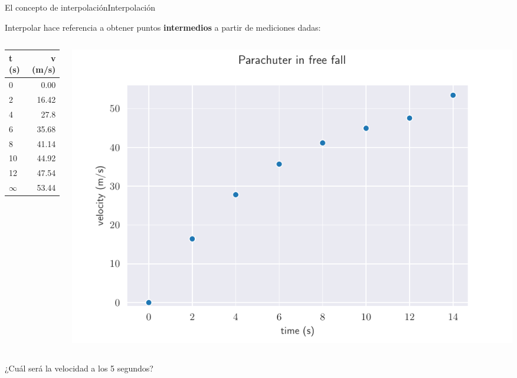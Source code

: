 \documentclass[spanish, c, dvipsnames]{beamer}
\begin{document}
\begin{frame}{El concepto de interpolación}{Interpolación}
    
    \alert{Interpolar} hace referencia a obtener puntos \textbf{intermedios} a partir de mediciones dadas:

    \bigskip
    \begin{columns}
        \begin{column}{0.5\textwidth}
            \begin{center}
                \begin{table}[H]
                    \begin{tabular}{lr}
                    \hline
                    \textbf{t (s)} & \textbf{v (m/s)} \\ \hline
                    0              & 0.00             \\
                    2              & 16.42            \\
                    4              & 27.8             \\
                    6              & 35.68            \\
                    8              & 41.14            \\
                    10             & 44.92            \\
                    12             & 47.54            \\
                    $\infty$       & 53.44            \\ \hline
                    \end{tabular}
                \end{table}
            \end{center}
        \end{column}
        \begin{column}{0.5\textwidth}
            \includegraphics[width=\columnwidth]{parachuter.pdf}
        \end{column}
    \end{columns}

    \bigskip
    ¿Cuál será la velocidad a los 5 segundos?
\end{frame}
\end{document}
